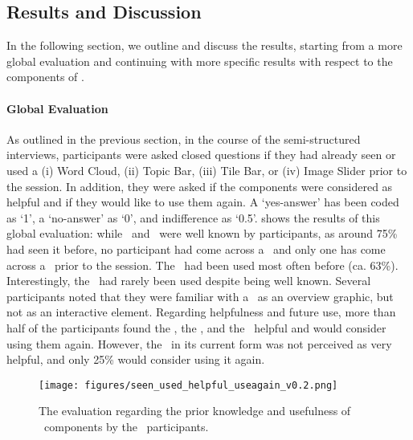 \subsection{Results and Discussion}
In the following section, we outline and discuss the results, starting from a more global evaluation and continuing with more specific results with respect to the components of \apluschis. 


\paragraph*{Global Evaluation} 
As outlined in the previous section, in the course of the semi-structured interviews, participants were asked closed questions if they had already seen or used a 
(i) Word Cloud, 
(ii) Topic Bar, 
(iii) Tile Bar, or 
(iv) Image Slider prior to the session. 
%
In addition, they were asked if the components were considered as helpful and if they would like to use them again. 
%
A `yes-answer' has been coded as `1', a `no-answer' as `0', and indifference as `0.5'.
%
 shows the results of this global evaluation: while \WordCloud\ and \ImageSlider\ were well known by participants, as around 75\% had seen it before, no participant had come across a \Tilebar\ and only one has come across a \Topicbar\ prior to the session. 
%
The \ImageSlider\ had been used most often before (ca. 63\%). 
%
Interestingly, the \WordCloud\ had rarely been used despite being well known. 
%
Several participants noted that they were familiar with a \WordCloud\ as an overview graphic, but not as an interactive element. 
%
Regarding helpfulness and future use, more than half of the participants found the \WordCloud, the \Tilebar, and the \ImageSlider\ helpful and would consider using them again. 
%
However, the \Topicbar\ in its current form was not perceived as very helpful, and only 25\% would consider using it again.

\begin{figure}
    \centering
    \texttt{[image: figures/seen\_used\_helpful\_useagain\_v0.2.png]}
    \caption{
    The evaluation regarding the prior knowledge and usefulness of \apluschis\ components by the \cwt\ participants.
    }
    \label{fig:seen_used_hepful_useagain}
\end{figure}



